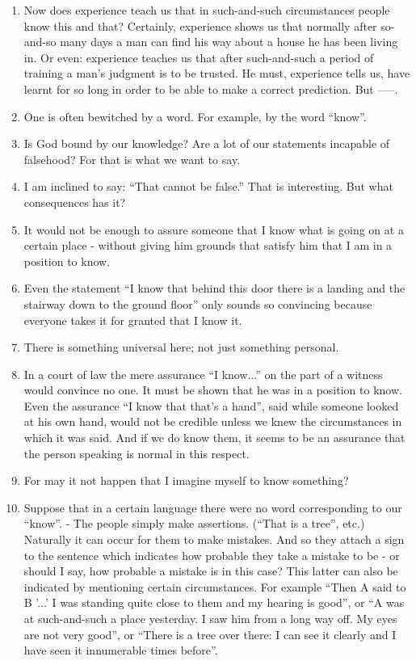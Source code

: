 \documentclass{book}
\begin{document}
\begin{enumerate}
\item
Now does experience teach us that in such-and-such circumstances people know
this and that? Certainly, experience shows us that normally after so-and-so
many days a man can find his way about a house he has been living in. Or even:
experience teaches us that after such-and-such a period of training a man's
judgment is to be trusted. He must, experience tells us, have learnt for so
long in order to be able to make a correct prediction. But -----.

\item
One is often bewitched by a word. For example, by the word ``know''.

\item
Is God bound by our knowledge? Are a lot of our statements incapable of
falsehood? For that is what we want to say.

\item
I am inclined to say: ``That cannot be false.'' That is interesting. But what
consequences has it?

\item
It would not be enough to assure someone that I know what is going on at a
certain place - without giving him grounds that satisfy him that I am in a
position to know.

\item
Even the statement ``I know that behind this door there is a landing and the
stairway down to the ground floor'' only sounds so convincing because everyone
takes it for granted that I know it.

\item
There is something universal here; not just something personal.

\item
In a court of law the mere assurance ``I know...'' on the part of a witness
would convince no one. It must be shown that he was in a position to know.
Even the assurance ``I know that that's a hand'', said while someone looked at
his own hand, would not be credible unless we knew the circumstances in which
it was said. And if we do know them, it seems to be an assurance that the
person speaking is normal in this respect.

\item
For may it not happen that I imagine myself to know something?

\item
Suppose that in a certain language there were no word corresponding to our
``know''. - The people simply make assertions. (``That is a tree'', etc.)
Naturally it can occur for them to make mistakes. And so they attach a sign to
the sentence which indicates how probable they take a mistake to be - or should
I say, how probable a mistake is in this case? This latter can also be
indicated by mentioning certain circumstances. For example ``Then A said to B
'...' I was standing quite close to them and my hearing is good'', or ``A was
at such-and-such a place yesterday. I saw him from a long way off. My eyes are
not very good'', or ``There is a tree over there: I can see it clearly and I
have seen it innumerable times before''.


\end{enumerate}
\end{document}
